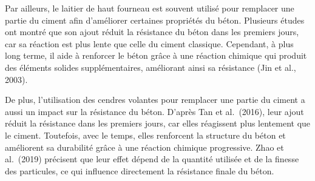 \documentclass[
  12pt,
]{article}
\begin{document}
Par ailleurs, le laitier de haut fourneau est souvent utilisé pour
remplacer une partie du ciment afin d'améliorer certaines propriétés du
béton. Plusieurs études ont montré que son ajout réduit la résistance du
béton dans les premiers jours, car sa réaction est plus lente que celle
du ciment classique. Cependant, à plus long terme, il aide à renforcer
le béton grâce à une réaction chimique qui produit des éléments solides
supplémentaires, améliorant ainsi sa résistance (Jin et al., 2003).

De plus, l'utilisation des cendres volantes pour remplacer une partie du
ciment a aussi un impact sur la résistance du béton. D'après Tan et
al.~(2016), leur ajout réduit la résistance dans les premiers jours, car
elles réagissent plus lentement que le ciment. Toutefois, avec le temps,
elles renforcent la structure du béton et améliorent sa durabilité grâce
à une réaction chimique progressive. Zhao et al.~(2019) précisent que
leur effet dépend de la quantité utilisée et de la finesse des
particules, ce qui influence directement la résistance finale du béton.
\end{document}
